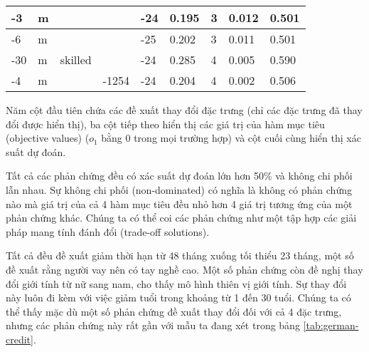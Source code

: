 \begin{table}[]
\begin{tabular}{|l|l|l|l|l|l|l|l|l|}
-3                                 & m                                 &                                   &                                      & -24                                    & 0.195                          & 3                              & 0.012                          & 0.501                          \\ \hline
-6                                 & m                                 &                                   &                                      & -25                                    & 0.202                          & 3                              & 0.011                          & 0.501                          \\ \hline
-30                                & m                                 & skilled                           &                                      & -24                                    & 0.285                          & 4                              & 0.005                          & 0.590                          \\ \hline
-4                                 & m                                 &                                   & -1254                                & -24                                    & 0.204                          & 4                              & 0.002                          & 0.506                          \\ \hline
\end{tabular}
\end{table}

Năm cột đầu tiên chứa các đề xuất thay đổi đặc trưng (chỉ các đặc trưng đã thay đổi được hiển thị), ba cột tiếp theo hiển thị các giá trị của hàm mục tiêu (objective values) ($o_1$ bằng 0 trong mọi trường hợp) và cột cuối cùng hiển thị xác suất dự đoán.

Tất cả các phản chứng đều có xác suất dự đoán lớn hơn 50\% và không chi phối lẫn nhau. Sự không chi phối (non-dominated) có nghĩa là không có phản chứng nào mà giá trị của cả 4 hàm mục tiêu đều nhỏ hơn 4 giá trị tương ứng của một phản chứng khác. Chúng ta có thể coi các phản chứng như một tập hợp các giải pháp mang tính đánh đổi (trade-off solutions).

Tất cả đều đề xuất giảm thời hạn từ 48 tháng xuống tối thiểu 23 tháng, một số đề xuất rằng người vay nên có tay nghề cao. Một số phản chứng còn đề nghị thay đổi giới tính từ nữ sang nam, cho thấy mô hình thiên vị giới tính. Sự thay đổi này luôn đi kèm với việc giảm tuổi trong khoảng từ 1 đến 30 tuổi. Chúng ta có thể thấy mặc dù một số phản chứng đề xuất thay đổi đối với cả 4 đặc trưng, nhưng các phản chứng này rất gần với mẫu ta đang xét trong bảng \ref{tab:german-credit}.

